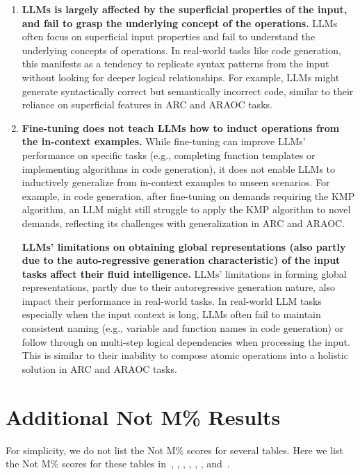 \begin{enumerate}
    \item \textbf{LLMs is largely affected by the superficial properties of the input, and fail to grasp the underlying concept of the operations.} LLMs often focus on superficial input properties and fail to understand the underlying concepts of operations. In real-world tasks like code generation, this manifests as a tendency to replicate syntax patterns from the input without looking for deeper logical relationships. For example, LLMs might generate syntactically correct but semantically incorrect code, similar to their reliance on superficial features in ARC and ARAOC tasks.

    \item \textbf{Fine-tuning does not teach LLMs how to induct operations from the in-context examples.} While fine-tuning can improve LLMs' performance on specific tasks (e.g., completing function templates or implementing algorithms in code generation), it does not enable LLMs to inductively generalize from in-context examples to unseen scenarios. For example, in code generation, after fine-tuning on demands requiring the KMP algorithm, an LLM might still struggle to apply the KMP algorithm to novel demands, reflecting its challenges with generalization in ARC and ARAOC.

    \textbf{LLMs' limitations on obtaining global representations (also partly due to the auto-regressive generation characteristic) of the input tasks affect their fluid intelligence.} LLMs' limitations in forming global representations, partly due to their autoregressive generation nature, also impact their performance in real-world tasks. In real-world LLM tasks especially when the input context is long, LLMs often fail to maintain consistent naming (e.g., variable and function names in code generation) or follow through on multi-step logical dependencies when processing the input. This is similar to their inability to compose atomic operations into a holistic solution in ARC and ARAOC tasks.
\end{enumerate}


\section{Additional Not M\% Results}

For simplicity, we do not list the Not M\% scores for several tables. Here we list the Not M\% scores for these tables in~, , , , , , and~.

